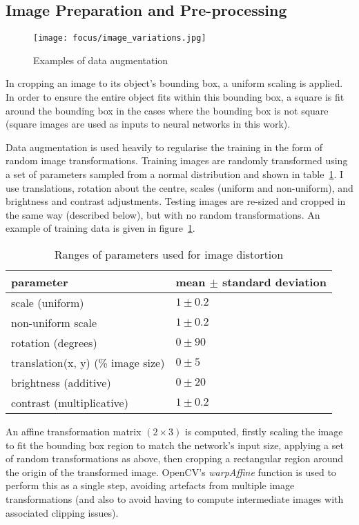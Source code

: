 \subsection {Image Preparation and Pre-processing}

\begin{figure}[t]
\centering
\texttt{[image: focus/image\_variations.jpg]}
\caption{Examples of data augmentation }
\label{fig:focus_variations}
\end{figure}


In cropping an image to its object's bounding box, a uniform scaling is applied. In order to ensure the entire object fits within this bounding box, a square is fit around the bounding box in the cases where the bounding box is not square (square images are used as inputs to neural networks in this work).

Data augmentation is used heavily to regularise the training in the form of random image transformations. Training images are randomly transformed using a set of parameters sampled from a normal distribution and shown in table~\ref{fig:focus_jitter}.  I use translations, rotation about the centre, scales (uniform and non-uniform), and brightness and contrast adjustments. Testing images are re-sized and cropped in the same way (described below), but with no random transformations. An example of training data is given in figure~\ref{fig:focus_variations}.

\begin{table}[h]
  \centering
    \caption{Ranges of parameters used for image distortion }
    
  \begin{tabular}{ l  l }
    parameter & mean $ \pm $ standard deviation \\
    \toprule
    scale (uniform) & $ 1 \pm 0.2 $  \\ 
    non-uniform scale  & $ 1 \pm 0.2 $  \\ 
    rotation (degrees) & $ 0 \pm 90 $ \\ 
    translation(x, y) (\% image size) & $ 0 \pm 5 $ \\ 
    brightness (additive) & $ 0 \pm 20 $ \\ 
    contrast (multiplicative) & $ 1 \pm 0.2 $ \\ 
    \bottomrule
  \end{tabular}
\label{fig:focus_jitter}
\end{table}


An affine transformation matrix $ (2 \times 3) $ is computed, firstly scaling the image to fit the bounding box region to match the network's input size, applying a set of random transformations as above, then cropping a rectangular region around the origin of the transformed image. OpenCV's \emph{warpAffine} function is used to perform this as a single step, avoiding artefacts from multiple image transformations (and also to avoid having to compute intermediate images with associated clipping issues).

